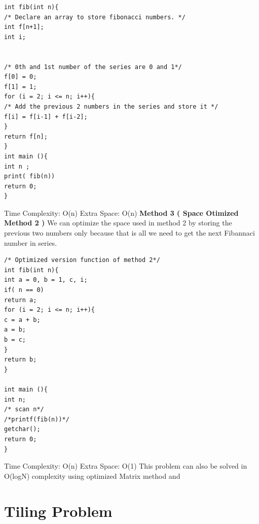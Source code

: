 \documentclass[12pt]{article}
\begin{document}
{\begin{lstlisting}
int fib(int n){
/* Declare an array to store fibonacci numbers. */
int f[n+1];
int i;


/* 0th and 1st number of the series are 0 and 1*/
f[0] = 0;
f[1] = 1;
for (i = 2; i <= n; i++){
/* Add the previous 2 numbers in the series and store it */
f[i] = f[i-1] + f[i-2];
}
return f[n];
}
int main (){
int n ;
print( fib(n))
return 0;
}
\end{lstlisting}
Time Complexity: O(n)\newline
Extra Space: O(n)
\vspace{6mm}
\newline
\textbf{Method 3 ( Space Otimized Method 2 )}
\vspace{3mm}
\newline
We can optimize the space used in method 2 by storing the previous two numbers only
because that is all we need to get the next Fibannaci number in series.
\vspace{3mm}
\begin{lstlisting}
/* Optimized version function of method 2*/
int fib(int n){
int a = 0, b = 1, c, i;
if( n == 0)
return a;
for (i = 2; i <= n; i++){
c = a + b;
a = b;
b = c;
}
return b;
}

int main (){
int n;
/* scan n*/
/*printf(fib(n))*/
getchar();
return 0;
}
\end{lstlisting}
Time Complexity: O(n)\newline
Extra Space: O(1)
\newline
This problem can also be solved in  O(logN) complexity using optimized Matrix method and 

\section{Tiling Problem}
\vspace{6mm}

}
\end{document}
